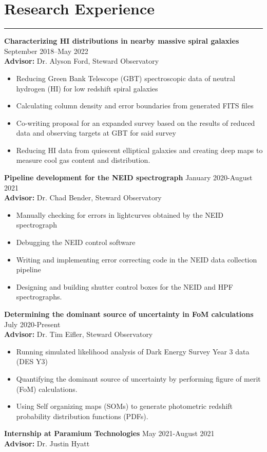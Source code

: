 \documentclass[11pt]{article}
\newcommand{\resumesection}[1]{\vspace{-0.2cm}\section*{#1}\vspace{-0.2cm}\hrule\vspace{0.2cm}}
\begin{document}
\resumesection{Research Experience}
\textbf{Characterizing HI distributions in nearby massive spiral galaxies}  \hfill September 2018--May 2022
\\\textbf{Advisor:} Dr. Alyson Ford, Steward Observatory
\begin{itemize}
	\item Reducing Green Bank Telescope (GBT) spectroscopic data of neutral hydrogen (HI) for low redshift spiral galaxies 
	\item Calculating column density and error boundaries from generated FITS files
	\item Co-writing proposal for an expanded survey based on the results of reduced data and observing targets at GBT for said survey  
	\item Reducing HI data from quiescent elliptical galaxies and creating deep maps to measure cool gas content and distribution. 
\end{itemize}
\textbf{Pipeline development for the NEID spectrograph} \hfill January 2020-August 2021
\\\textbf{Advisor:} Dr. Chad Bender, Steward Observatory
\begin{itemize}
	\item Manually checking for errors in lightcurves obtained by the NEID spectrograph
	\item Debugging the NEID control software 
	\item Writing and implementing error correcting code in the NEID data collection pipeline
	\item Designing and building shutter control boxes for the NEID and HPF spectrographs.
\end{itemize}
\textbf{Determining the dominant source of uncertainty in FoM calculations} \hfill July 2020-Present
\\ \textbf{Advisor:} Dr. Tim Eifler, Steward Observatory
\begin{itemize}
	\item Running simulated likelihood analysis of Dark Energy Survey Year 3 data (DES Y3)
	\item Quantifying the dominant source of uncertainty by performing figure of merit (FoM) calculations.
	\item Using Self organizing maps (SOMs) to generate photometric redshift probability distribution functions (PDFs). 
\end{itemize}
\textbf{Internship at Paramium Technologies}  \hfill May 2021-August 2021
\\\textbf{Advisor:} Dr. Justin Hyatt
\end{document}
